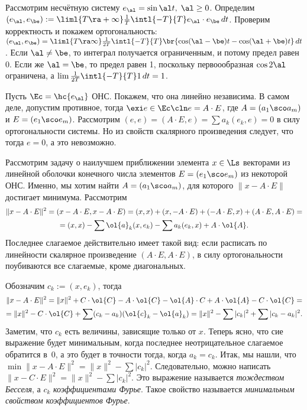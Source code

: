 \documentclass[a4paper]{article}
\begin{document}
Рассмотрим несчётную систему $e_\al = \sin \al t,\; \al \ge 0$. Определим $(e_\al,e_\be):=\liml{T
\ra +\infty} \frac{1}{T} \intl{-T}{T}e_\al \cdot e_\be \,d t$. Проверим корректность и покажем
ортогональность: $(e_\al,e_\be)=\liml{T \ra \infty}\frac{1}{2T}\intl{-T}{T}\br{\cos(\al-\be)t -
\cos (\al+\be)t}\,d t$. Если $\al \neq \be$, то интеграл получается ограниченным, и потому предел
равен 0. Если же $\al = \be$, то предел равен 1, поскольку первоообразная $\cos 2\al$ ограничена, а
$\lim\frac{1}{2T}\intl{-T}{T} 1 \,d t = 1$.

Пусть $\Ec = \hc{e_\al}$ ОНС. Покажем, что она линейно независима. В самом деле,
допустим противное, тогда $\exi e \in \Ec\cln e = A \cdot E$, где $A = (a_1\sco a_m)$ и
$E = (e_1\sco e_m)$. Рассмотрим $(e,e) = (A \cdot E, e) = \sum a_k (e_k,e) =0$ в силу
ортогональности системы. Но из свойств скалярного произведения следует, что тогда
$e = 0$, а это невозможно.

Рассмотрим задачу о наилучшем приближении элемента $x \in \Ls$ векторами из линейной оболочки конечного
числа элементов $E = (e_1\sco e_m)$ из некоторой ОНС. Именно, мы хотим найти $A = (a_1\sco a_m)$, для которого
$\|x - A\cdot E\|$ достигает минимума.
Рассмотрим
\begin{multline*}
\|x - A \cdot E\|^2 = (x - A\cdot E, x - A\cdot E) = (x,x) + (x, -A\cdot E) + (-A\cdot E, x) +
(A\cdot E, A\cdot E) =\\= (x,x)-\sum \ol{a}_k(x,e_k) - \sum a_k (e_k,x) + A \cdot \ol{A}.
\end{multline*}
Последнее слагаемое действительно имеет такой вид: если расписать
по линейности скалярное произведение $(A\cdot E, A \cdot E)$, в силу ортогональности поубиваются все
слагаемые, кроме диагональных.

Обозначим $c_k := (x, e_k)$, тогда
\begin{multline*}
\|x - A\cdot E\|^2 = \|x\|^2 + C \cdot \ol{C} - A \cdot \ol{C} - \ol{A}\cdot C + A \cdot \ol{A} - C \cdot \ol{C}=\\=
\|x\|^2 - C \cdot \ol{C} + \sum (c_k -a_k)(\ol{c}_k -\ol{a}_k) = \|x\|^2 - \sum |c_k|^2 + \sum|c_k-a_k|^2.
\end{multline*}
Заметим, что $c_k$ есть величины,
зависящие только от $x$. Теперь ясно, что сие выражение будет минимальным, когда последнее
неотрицательное слагаемое обратится в~0, а это будет в точности тогда, когда $a_k = c_k$. Итак, мы
нашли, что $\min \|x-A\cdot E\|^2 = \|x\|^2 - \sum |c_k|^2$.
Следовательно, можно написать $\|x - C\cdot E\|^2 = \|x\|^2 - \sum |c_k|^2$. Это выражение
называется \emph{тождеством Бесселя}, а $c_k$ \emph{коэффициентами Фурье}. Такое свойство
называется \emph{минимальным свойством коэффициентов Фурье}.
\end{document}
